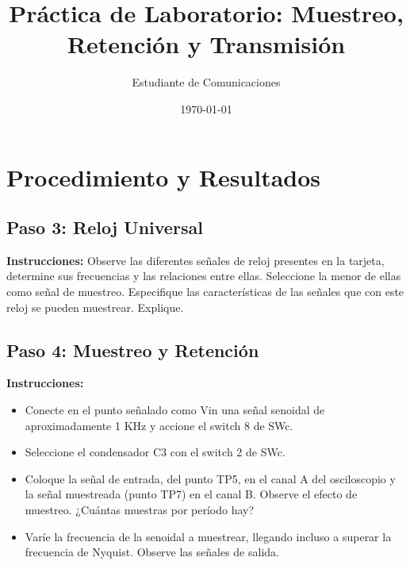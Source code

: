 \documentclass[12pt]{article}
\title{Práctica de Laboratorio: Muestreo, Retención y Transmisión}
\author{Estudiante de Comunicaciones}
\date{\today}
\begin{document}
\section{Procedimiento y Resultados}

\subsection{Paso 3: Reloj Universal}
\textbf{Instrucciones:} Observe las diferentes señales de reloj presentes en la tarjeta, determine sus frecuencias y las relaciones entre ellas. Seleccione la menor de ellas como señal de muestreo. Especifique las características de las señales que con este reloj se pueden muestrear. Explique.





\subsection{Paso 4: Muestreo y Retención}
\textbf{Instrucciones:}
\begin{itemize}
    \item Conecte en el punto señalado como Vin una señal senoidal de aproximadamente 1 KHz y accione el switch 8 de SWc.
    \item Seleccione el condensador C3 con el switch 2 de SWc.
    \item Coloque la señal de entrada, del punto TP5, en el canal A del osciloscopio y la señal muestreada (punto TP7) en el canal B. Observe el efecto de muestreo. ¿Cuántas muestras por período hay?
    \item Varíe la frecuencia de la senoidal a muestrear, llegando incluso a superar la frecuencia de Nyquist. Observe las señales de salida.
\end{itemize}
\end{document}
